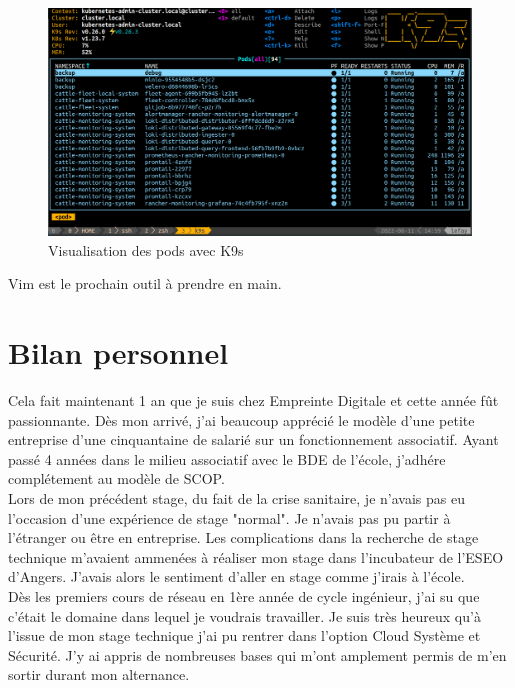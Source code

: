 \documentclass[12pt, a4paper, twoside]{article}
\begin{document}
\begin{figure}[!ht]
    \centering
        \includegraphics[width=\textwidth]{src/interface_k9s.png}
    \caption{Visualisation des pods avec K9s}
    \label{fig:k9s}
\end{figure}

Vim est le prochain outil à prendre en main.

\newpage
\part{Bilan personnel}
Cela fait maintenant 1 an que je suis chez Empreinte Digitale et cette année fût passionnante.
Dès mon arrivé, j'ai beaucoup apprécié le modèle d'une petite entreprise d'une cinquantaine de salarié sur un fonctionnement associatif.
Ayant passé 4 années dans le milieu associatif avec le BDE de l'école, j'adhére complétement au modèle de \gls{SCOP}.\\

Lors de mon précédent stage, du fait de la crise sanitaire, je n'avais pas eu l'occasion d'une expérience de stage "normal".
Je n'avais pas pu partir à l'étranger ou être en entreprise.
Les complications dans la recherche de stage technique m'avaient ammenées à réaliser mon stage dans l'incubateur de l'ESEO d'Angers.
J'avais alors le sentiment d'aller en stage comme j'irais à l'école.\\

Dès les premiers cours de réseau en 1ère année de cycle ingénieur, j'ai su que c'était le domaine dans lequel je voudrais travailler.
Je suis très heureux qu'à l'issue de mon stage technique j'ai pu rentrer dans l'option Cloud Système et Sécurité.
J'y ai appris de nombreuses bases qui m'ont amplement permis de m'en sortir durant mon alternance.\\
\end{document}
